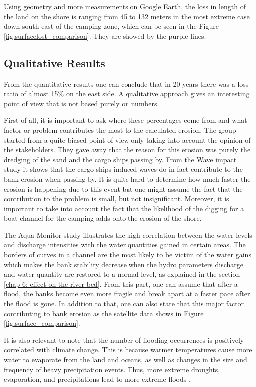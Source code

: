 Using geometry and more measurements on Google Earth, the loss in length of the land on the shore is ranging from 45 to 132 meters in the most extreme case down south east of the camping zone, which can be seen in the Figure \ref{fig:surfacelost_comparison}. They are showed by the purple lines.

\subsection{Qualitative Results}
From the quantitative results one can conclude that in 20 years there was a loss ratio of almost 15\% on the east side. A qualitative approach gives an interesting point of view that is not based purely on numbers.

First of all, it is important to ask where these percentages come from and what factor or problem contributes the most to the calculated erosion. The group started from a quite biased point of view only taking into account the opinion of the stakeholders. They gave away that the reason for this erosion was purely the dredging of the sand and the cargo ships passing by. From the Wave impact study it shows that the cargo ships induced waves do in fact contribute to the bank erosion when passing by. It is quite hard to determine how much faster the erosion is happening due to this event but one might assume the fact that the contribution to the problem is small, but not insignificant. Moreover, it is important to take into account the fact that the likelihood of the digging for a boat channel for the camping adds onto the erosion of the shore.

The Aqua Monitor study illustrates the high correlation between the water levels and discharge intensities with the water quantities gained in certain areas. The borders of curves in a channel are the most likely to be victim of the water gains which makes the bank stability decrease when the hydro parameters discharge and water quantity are restored to a normal level, as explained in the section \ref{chap 6: effect on the river bed}. From this part, one can assume that after a flood, the banks become even more fragile and break apart at a faster pace after the flood is gone.
In addition to that, one can also state that this major factor contributing to bank erosion as the satellite data shows in Figure \ref{fig:surface_comparison}.

It is also relevant to note that the number of flooding occurrences is positively correlated with climate change. This is because warmer temperatures cause more water to evaporate from the land and oceans, as well as changes in the size and frequency of heavy precipitation events. Thus, more extreme droughts, evaporation, and precipitations lead to more extreme floods \autocite{usenvironmentalprotectionagencyClimateChangeIndicators2016}.

